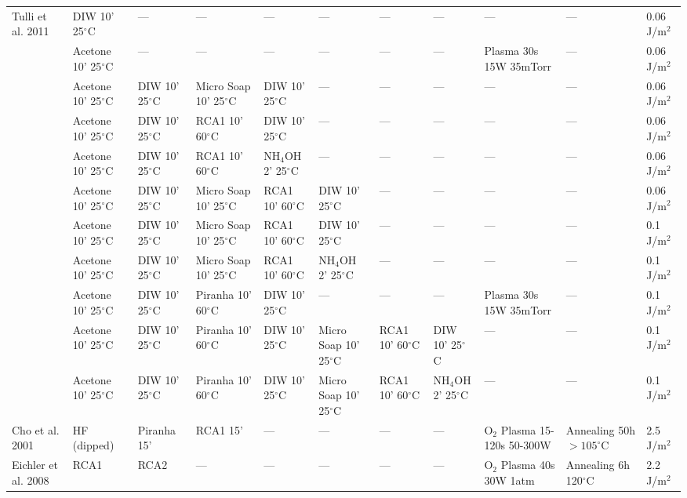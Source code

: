 \begin{landscape}
\begin{table}[p]
{\begin{tabular}{l l l l l l l l l l l}
Tulli et al. 2011\cite{tulli2011}
    & DIW 10' 25$^\circ$C & --- & --- & --- & --- & --- & --- & --- & --- & 0.06 J/m$^2$ \\
    & Acetone 10' 25$^\circ$C & --- & --- & --- & --- & --- & --- & Plasma 30s 15W 35mTorr & --- & 0.06 J/m$^2$ \\
    & Acetone 10' 25$^\circ$C & DIW 10' 25$^\circ$C & Micro Soap 10' 25$^\circ$C & DIW 10' 25$^\circ$C & --- & --- & --- & --- & --- & 0.06 J/m$^2$ \\
    & Acetone 10' 25$^\circ$C & DIW 10' 25$^\circ$C & RCA1 10' 60$^\circ$C & DIW 10' 25$^\circ$C & --- & --- & --- & --- & --- & 0.06 J/m$^2$ \\
    & Acetone 10' 25$^\circ$C & DIW 10' 25$^\circ$C & RCA1 10' 60$^\circ$C & NH$_4$OH 2' 25$^\circ$C & --- & --- & --- & --- & --- & 0.06 J/m$^2$ \\
    & Acetone 10' 25$^\circ$C & DIW 10' 25$^\circ$C & Micro Soap 10' 25$^\circ$C & RCA1 10' 60$^\circ$C & DIW 10' 25$^\circ$C & --- & --- & --- & --- & 0.06 J/m$^2$ \\
    & Acetone 10' 25$^\circ$C & DIW 10' 25$^\circ$C & Micro Soap 10' 25$^\circ$C & RCA1 10' 60$^\circ$C & DIW 10' 25$^\circ$C & --- & --- & --- & --- & 0.1 J/m$^2$ \\
    & Acetone 10' 25$^\circ$C & DIW 10' 25$^\circ$C & Micro Soap 10' 25$^\circ$C & RCA1 10' 60$^\circ$C & NH$_4$OH 2' 25$^\circ$C & --- & --- & --- & --- & 0.1 J/m$^2$ \\
    & Acetone 10' 25$^\circ$C & DIW 10' 25$^\circ$C & Piranha 10' 60$^\circ$C & DIW 10' 25$^\circ$C & --- & --- & --- & Plasma 30s 15W 35mTorr & --- & 0.1 J/m$^2$ \\
    & Acetone 10' 25$^\circ$C & DIW 10' 25$^\circ$C & Piranha 10' 60$^\circ$C & DIW 10' 25$^\circ$C & Micro Soap 10' 25$^\circ$C & RCA1 10' 60$^\circ$C & DIW 10' 25$^\circ$C & --- & --- & 0.1 J/m$^2$ \\
    & Acetone 10' 25$^\circ$C & DIW 10' 25$^\circ$C & Piranha 10' 60$^\circ$C & DIW 10' 25$^\circ$C & Micro Soap 10' 25$^\circ$C & RCA1 10' 60$^\circ$C & NH$_4$OH 2' 25$^\circ$C & --- & --- & 0.1 J/m$^2$ \\
\addlinespace
Cho et al. 2001 \cite{cho2001}
    & HF (dipped) & Piranha 15' & RCA1 15' & --- & --- & --- & --- & O$_2$ Plasma 15-120s 50-300W & Annealing 50h $> 105^\circ$C & 2.5 J/m$^2$ \\
\addlinespace
Eichler et al. 2008 \cite{eichler2008}
    & RCA1 & RCA2 & --- & --- & --- & --- & --- & O$_2$ Plasma 40s 30W 1atm & Annealing 6h 120$^\circ$C & 2.2 J/m$^2$ \\

\end{tabular}}
\end{table}
\end{landscape}
